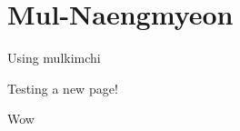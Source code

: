 \chapter*{Mul-Naengmyeon}
\renewcommand{\chaptertitle}{Mul-Naengmyeon}

Using mulkimchi

\newpage
Testing a new page!

\newpage

Wow
